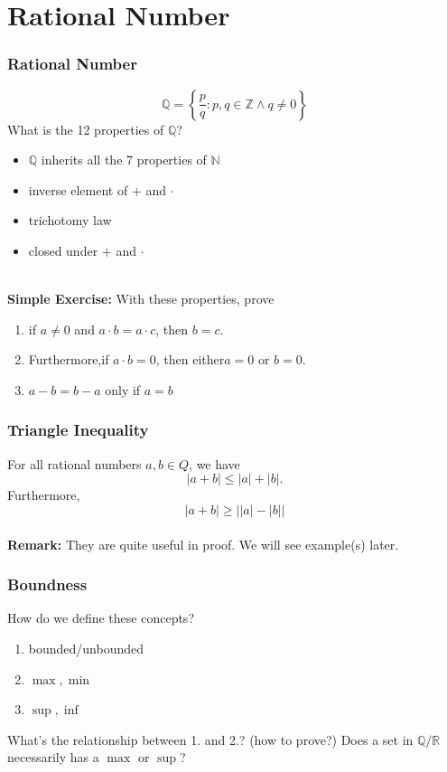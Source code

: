 \documentclass[10pt, t]{beamer}
\newcommand{\N}{\mathbb{N}}
\newcommand{\R}{\mathbb{R}}
\newcommand{\nullspace}{~\\[15pt]}
\begin{document}
\section{Rational Number}
\begin{frame}
    \frametitle{Rational Number}
    $$\mathbb{Q}=\left\{\frac{p}{q}: p, q \in \mathbb{Z} \wedge q \neq 0\right\}$$
    What is the 12 properties of $\mathbb{Q}$?
    \pause
    \begin{itemize}
        \item $\mathbb{Q}$ inherits all the 7 properties of $\N$
        \item inverse element of $+$ and $\cdot$
        \item trichotomy law
        \item closed under $+$ and $\cdot$
    \end{itemize}
    \nullspace
    \textbf{Simple Exercise:}
    With these properties, prove
    \begin{enumerate}
        \item
              if $a\neq 0$ and $a \cdot b = a \cdot c$, then
              $b = c$.
        \item
              Furthermore,if $a \cdot b = 0$, then either$ a = 0 $ or $ b = 0$.
        \item  $a - b = b - a$ only if $a = b$
    \end{enumerate}
\end{frame}

\begin{frame}
    \frametitle{Triangle Inequality}

    For all rational numbers $a,b\in Q$, we have
    $$|a + b| \leq |a| + |b|.$$ Furthermore,
    $$|a + b| \geq    \left||a| - |b|\right| $$
    \nullspace
    \textbf{Remark:} They are quite useful in proof. We will see example(s) later.
\end{frame}

\begin{frame}
    \frametitle{Boundness}

    How do we define these concepts?
    \begin{enumerate}
        \item bounded/unbounded
        \item $\max,\min$
        \item $\sup,\inf$
    \end{enumerate}
    What's the relationship between 1. and 2.? (how to prove?) Does a set in $\mathbb{Q}/\R$ necessarily has a $\max$ or $\sup$?
\end{frame}
\end{document}
